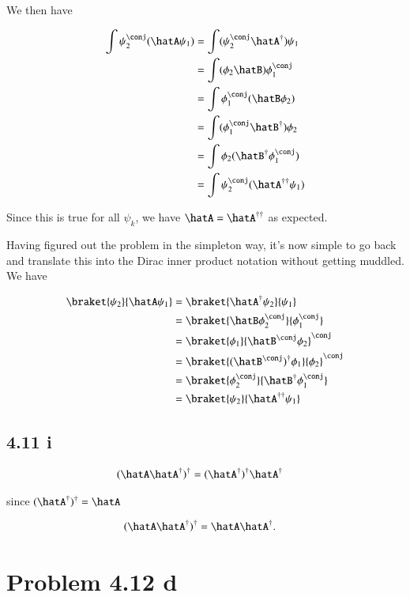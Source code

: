 We then have

\begin{align*}
\int \psi_2^\conj (\hatA \psi_1)
&=
\int (\psi_2^\conj \hatA^\dagger) \psi_1 \\
&=
\int (\phi_2 \hatB) \phi_1^\conj \\
&=
\int \phi_1^\conj (\hatB \phi_2) \\
&=
\int (\phi_1^\conj \hatB^\dagger) \phi_2 \\
&=
\int \phi_2 (\hatB^\dagger \phi_1^\conj) \\
&=
\int \psi_2^\conj (\hatA^{\dagger \dagger} \psi_1) \\
\end{align*}

Since this is true for all $\psi_k$, we have $\hatA = \hatA^{\dagger \dagger}$ as expected.

Having figured out the problem in the simpleton way, it's now simple to go back and translate this into the Dirac inner product notation without getting muddled.  We have

\begin{align*}
\braket{ \psi_2 }{ \hatA \psi_1 } 
&=
\braket{ \hatA^\dagger \psi_2 }{ \psi_1 }  \\
&=
\braket{ \hatB \phi_2^\conj }{ \phi_1^\conj }  \\
&=
{\braket{ \phi_1 }{ \hatB^\conj \phi_2}}^\conj  \\
&=
{\braket{ (\hatB^\conj)^\dagger \phi_1 }{ \phi_2}}^\conj  \\
&=
\braket{\phi_2^\conj }{ \hatB^\dagger \phi_1^\conj } \\
&=
\braket{\psi_2 }{ \hatA^{\dagger \dagger} \psi_1 } \\
\end{align*}

\subsection{4.11 i}

\begin{align*}
(\hatA \hatA^\dagger)^\dagger &= (\hatA^\dagger)^\dagger \hatA^\dagger 
\end{align*}

since $(\hatA^\dagger) ^\dagger = \hatA$

\begin{align*}
(\hatA \hatA^\dagger)^\dagger &= \hatA \hatA^\dagger.
\end{align*}

\section{Problem 4.12 d}

